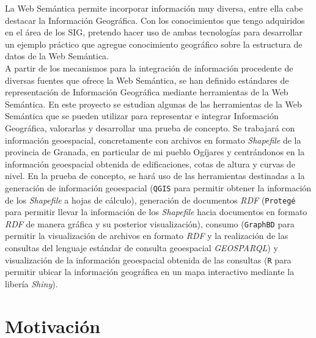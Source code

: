 

La Web Semántica permite incorporar información muy diversa, entre ella cabe destacar la Información Geográfica. Con los conocimientos que tengo adquiridos en el área de los SIG, pretendo hacer uso de ambas tecnologías para desarrollar un ejemplo práctico que agregue conocimiento geográfico sobre la estructura de datos de la Web Semántica. \\ %

A partir de los mecanismos para la integración de información procedente de diversas fuentes que ofrece la Web Semántica, se han definido estándares de representación de Información Geográfica mediante herramientas de la Web Semántica. En este proyecto se estudian algunas de las herramientas de la Web Semántica que se pueden utilizar para representar e integrar Información Geográfica, valorarlas y desarrollar una prueba de concepto. Se trabajará con información geoespacial, concretamente con archivos en formato \textit{Shapefile} de la provincia de Granada, en particular de mi pueblo Ogíjares y centrándonos en la información geoespacial obtenida de edificaciones, cotas de altura y curvas de nivel. En la prueba de concepto, se hará uso de las herramientas destinadas a la generación de información geoespacial (\texttt{QGIS} para permitir obtener la información de los \textit{Shapefile} a hojas de cálculo), generación de documentos \textit{RDF}  (\texttt{Protegé} para permitir llevar la información de los \textit{Shapefile} hacia documentos en formato \textit{RDF} de manera gráfica y su posterior visualización), consumo (\texttt{GraphBD} para permitir la visualización de archivos en formato \textit{RDF} y la realización de las consultas del lenguaje estándar de consulta geoespacial \textit{GEOSPARQL}) y visualización de la información geoespacial obtenida de las consultas (\texttt{R} para permitir ubicar la información geográfica en un mapa interactivo mediante la libería \textit{Shiny}).


\section{Motivación}

